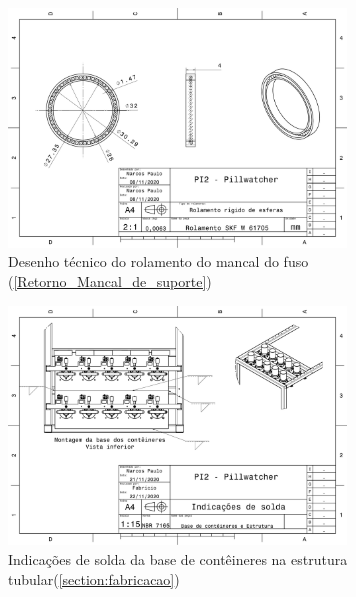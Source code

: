 \begin{apendicesenv}
\begin{figure}[H]
    \centering
    \includegraphics[width=0.8\textwidth]{figuras/estrutura/Desenhos/Rolamento_fuso.pdf}
    \caption{Desenho técnico do rolamento do mancal do fuso (\ref{Retorno_Mancal_de_suporte})}
    \label{fig:rolamento_fuso}
\end{figure}

\begin{figure}[H]
    \centering
    \includegraphics[width=0.8\textwidth]{figuras/estrutura/Desenhos/Solda_Base_Tubos.pdf}
    \caption{Indicações de solda da base de contêineres na estrutura tubular(\ref{section:fabricacao})}
    \label{fig:Solda_Base_Estrutura}
\end{figure}


\end{apendicesenv}
